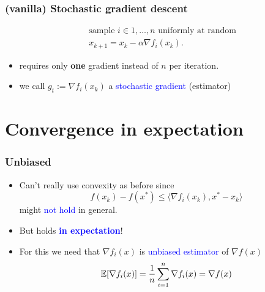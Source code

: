 \documentclass{beamer}
\begin{document}
\begin{frame}
  \frametitle{(vanilla) Stochastic gradient descent}

  \begin{block}{}
    \begin{align}
      &\text{sample $i\in 1,\dots, n$ uniformly at random} \\
      &x_{k+1} = x_k - \alpha \nabla f_i(x_k).
    \end{align}
  \end{block}

  \begin{itemize}
    \item requires only \textbf{one} gradient instead of $n$ per iteration.
    \item we call $g_t := \nabla f_i(x_k)$ a \textcolor{blue}{stochastic gradient} (estimator)
  \end{itemize}
\end{frame}


\section{Convergence in expectation}%
\label{sec:}

\begin{frame}
  \frametitle{Unbiased}
  \begin{itemize}
    \item Can't really use convexity as before since
          \begin{equation}
            f(x_k)-f(x^*) \le \langle \nabla f_i(x_k), x^*-x_k \rangle
          \end{equation}
          might \textcolor{blue}{not hold} in general.
    \item But holds \textcolor{blue}{\textbf{in expectation}}!
    \item For this we need that $\nabla f_i(x)$ is \textcolor{blue}{unbiased estimator} of $\nabla f(x)$
  \begin{equation}
    \mathbb{E} [\nabla f_i(x)] = \frac{1}{n} \sum_{i=1}^{n} \nabla f_i(x) = \nabla f(x)
  \end{equation}
  \end{itemize}
\end{frame}
\end{document}
